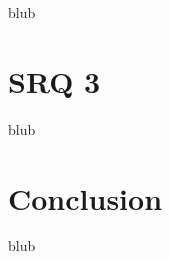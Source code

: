 \label{SectionLiteratureReviewSRQ2}

blub




\section{SRQ 3}

\label{SectionLiteratureReviewSRQ3}

blub





\section{Conclusion}

\label{SectionLiteratureReviewConclusion}

blub

